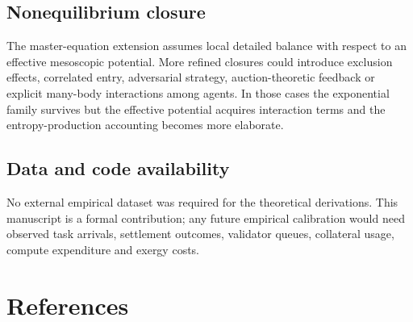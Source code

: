 \subsection{Nonequilibrium closure}\label{nonequilibrium-closure}

The master-equation extension assumes local detailed balance with
respect to an effective mesoscopic potential. More refined closures
could introduce exclusion effects, correlated entry, adversarial
strategy, auction-theoretic feedback or explicit many-body interactions
among agents. In those cases the exponential family survives but the
effective potential acquires interaction terms and the
entropy-production accounting becomes more elaborate.

\subsection{Data and code
availability}\label{data-and-code-availability}

No external empirical dataset was required for the theoretical
derivations. This manuscript is a formal contribution; any future
empirical calibration would need observed task arrivals, settlement
outcomes, validator queues, collateral usage, compute expenditure and
exergy costs.

\section{References}\label{references}

